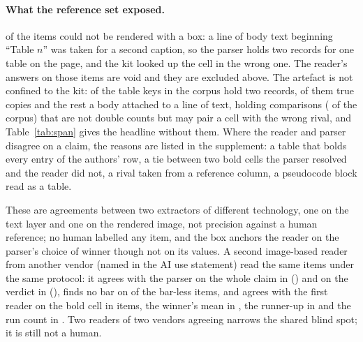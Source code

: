 \documentclass[sigconf,anonymous]{aamas}
\begin{document}
\paragraph{What the reference set exposed.} \nGUnboxedN{} of the
\nGDrawnN{} items could not be rendered with a box: a line of body text
beginning ``Table $n$'' was taken for a second caption, so the parser holds
two records for one table on the page, and the kit looked up the cell in the
wrong one. The reader's answers on those items are void and they are
excluded above. The artefact is not confined to the kit: \nADupKeys{} of the
\nATableKeys{} table keys in the corpus hold two records, \nADupIdentical{}
of them true copies and the rest a body attached to a line of text, holding
\nADupComparisons{} comparisons (\nADupPct{} of the corpus) that are not
double counts but may pair a cell with the wrong rival, and
Table~\ref{tab:span} gives the headline without them. Where the reader and
parser disagree on a claim, the reasons are listed in the supplement: a
table that bolds every entry of the authors' row, a tie between two bold
cells the parser resolved and the reader did not, a rival taken from a
reference column, a pseudocode block read as a table.

These are agreements between two extractors of different technology, one on
the text layer and one on the rendered image, not precision against a human
reference; no human labelled any item, and the box anchors the reader on the
parser's choice of winner though not on its values. A second image-based
reader from another vendor (named in the AI use statement) read the same
items under the same protocol: it agrees with the parser on the whole claim
in \nGThreeClaimFrac{} (\nGThreeClaim{}) and on the verdict in
\nGThreeVerdictFrac{} (\nGThreeVerdict{}), finds no bar on
\nGThreeNoBarAbsentFrac{} of the bar-less items, and agrees with the first
reader on the bold cell in \nReadersAgreeBold{} items, the winner's mean in
\nReadersAgreeWinner{}, the runner-up in \nReadersAgreeRunner{} and the run
count in \nReadersAgreeRuns{}. Two readers of two vendors agreeing narrows
the shared blind spot; it is still not a human.
\end{document}
